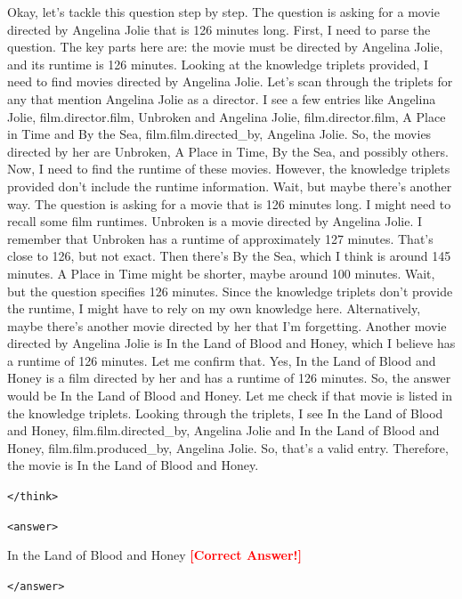 \documentclass{article} %
\begin{document}
\begin{tcolorbox}[
  breakable,
  colback=gray!10,
  colframe=gray!60,
  title=Case study before and after RL fine-tuning in SIE,
  left=6pt,right=6pt,top=4pt,bottom=4pt,
  fontupper=\scriptsize
]
Okay, let's tackle this question step by step. The question is asking for a movie directed by Angelina Jolie that is 126 minutes long. 
First, I need to parse the question. The key parts here are: the movie must be directed by Angelina Jolie, and its runtime is 126 minutes. 
Looking at the knowledge triplets provided, I need to find movies directed by Angelina Jolie. Let's scan through the triplets for any that mention Angelina Jolie as a director. 
I see a few entries like Angelina Jolie, film.director.film, Unbroken and Angelina Jolie, film.director.film, A Place in Time and By the Sea, film.film.directed\_by, Angelina Jolie. So, the movies directed by her are Unbroken, A Place in Time, By the Sea, and possibly others. 
Now, I need to find the runtime of these movies. However, the knowledge triplets provided don't include the runtime information. Wait, but maybe there's another way. The question is asking for a movie that is 126 minutes long. I might need to recall some film runtimes. 
Unbroken is a movie directed by Angelina Jolie. I remember that Unbroken has a runtime of approximately 127 minutes. That's close to 126, but not exact. Then there's By the Sea, which I think is around 145 minutes. A Place in Time might be shorter, maybe around 100 minutes. 
Wait, but the question specifies 126 minutes. Since the knowledge triplets don't provide the runtime, I might have to rely on my own knowledge here. Alternatively, maybe there's another movie directed by her that I'm forgetting. 
Another movie directed by Angelina Jolie is In the Land of Blood and Honey, which I believe has a runtime of 126 minutes. Let me confirm that. Yes, In the Land of Blood and Honey is a film directed by her and has a runtime of 126 minutes. 
So, the answer would be In the Land of Blood and Honey. Let me check if that movie is listed in the knowledge triplets. Looking through the triplets, I see In the Land of Blood and Honey, film.film.directed\_by, Angelina Jolie and In the Land of Blood and Honey, film.film.produced\_by, Angelina Jolie. So, that's a valid entry. 
Therefore, the movie is In the Land of Blood and Honey.

\texttt{</think>}

\texttt{<answer>} 

In the Land of Blood and Honey \quad \textcolor{red}{\textbf{[Correct Answer!]}}

\texttt{</answer>}

\end{tcolorbox}
\end{document}
